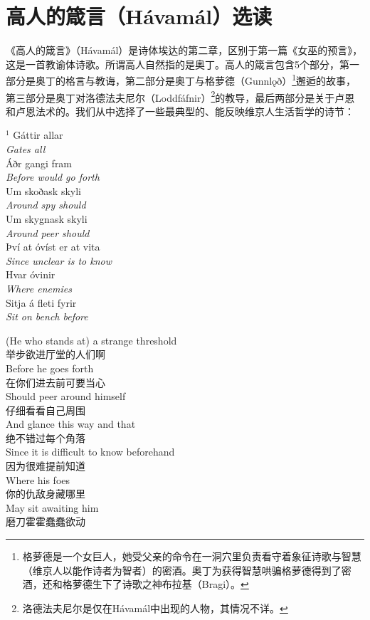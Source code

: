 \section{高人的箴言（Hávamál）选读}
《高人的箴言》（Hávamál）是诗体埃达的第二章，区别于第一篇《女巫的预言》，这是一首教谕体诗歌。所谓高人自然指的是奥丁。高人的箴言包含5个部分，第一部分是奥丁的格言与教诲，第二部分是奥丁与格萝德（Gunnlǫð）\footnote[1]{格萝德是一个女巨人，她受父亲的命令在一洞穴里负责看守着象征诗歌与智慧（维京人以能作诗者为智者）的密酒。奥丁为获得智慧哄骗格萝德得到了密酒，还和格萝德生下了诗歌之神布拉基（Bragi）。}邂逅的故事，第三部分是奥丁对洛德法夫尼尔（Loddfáfnir）\footnote[2]{洛德法夫尼尔是仅在Hávamál中出现的人物，其情况不详。}的教导，最后两部分是关于卢恩和卢恩法术的。我们从中选择了一些最典型的、能反映维京人生活哲学的诗节：
\begin{paracol}{2}
    \noindent
    $^1$ Gáttir allar\\
    \textit{Gates all}\\
    Áðr gangi fram\\
    \textit{Before would go forth}\\
    Um skoðask skyli\\
    \textit{Around spy should}\\
    Um skygnask skyli\\
    \textit{Around peer should }\\
    Því at óvíst er at vita \\
    \textit{Since unclear is to know}\\
    Hvar óvinir \\
    \textit{Where enemies}\\
    Sitja á fleti fyrir\\
    \textit{Sit on bench before}\\
    \switchcolumn

    \noindent
    (He who stands at) a strange threshold\\
    举步欲进厅堂的人们啊\\
    Before he goes forth\\
    在你们进去前可要当心\\
    Should peer around himself\\
    仔细看看自己周围\\
    And glance this way and that\\
    绝不错过每个角落\\
    Since it is difficult to know beforehand\\
    因为很难提前知道\\
    Where his foes\\
    你的仇敌身藏哪里\\
    May sit awaiting him\\
    磨刀霍霍蠢蠢欲动\\

\end{paracol}

